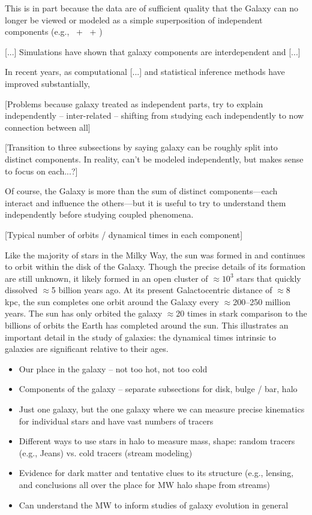 This is in part because the data are of sufficient quality that the Galaxy can no longer be viewed or modeled as a simple superposition of independent components (e.g., \mwdisk\ + \mwbulge\ + \mwhalo)

[...] Simulations have shown that galaxy components are interdependent and [...] \citep{todo}

In recent years, as computational [...] and statistical inference methods have improved substantially, 

[Problems because galaxy treated as independent parts, try to explain independently -- inter-related -- shifting from studying each independently to now connection between all]

[Transition to three subsections by saying galaxy can be roughly split into distinct components. In reality, can't be modeled independently, but makes sense to focus on each...?]


Of course, the Galaxy is more than the sum of distinct components---each interact and influence the others---but it is useful to try to understand them independently before studying coupled phenomena. 



[Typical number of orbits / dynamical times in each component]

Like the majority of stars in the Milky Way, the sun was formed in and continues to orbit within the disk of the Galaxy. Though the precise details of its formation are still unknown, it likely formed in an open cluster of $\approx$$10^3$ stars that quickly dissolved $\approx$5 billion years ago. At its present Galactocentric distance of $\approx$8 kpc, the sun completes one orbit around the Galaxy every $\approx$200--250 million years. The sun has only orbited the galaxy $\approx$20 times in stark comparison to the billions of orbits the Earth has completed around the sun. This illustrates an important detail in the study of galaxies: the dynamical times intrinsic to galaxies are significant relative to their ages.

\begin{itemize}
	\item Our place in the galaxy -- not too hot, not too cold
	\item Components of the galaxy -- separate subsections for disk, bulge / bar, halo
	\item Just one galaxy, but the one galaxy where we can measure precise kinematics for individual stars and have vast numbers of tracers
	\item Different ways to use stars in halo to measure mass, shape: random tracers (e.g., Jeans) vs. cold tracers (stream modeling)
	\item Evidence for dark matter and tentative clues to its structure (e.g., lensing, and conclusions all over the place for MW halo shape from streams)
	\item Can understand the MW to inform studies of galaxy evolution in general
\end{itemize}

